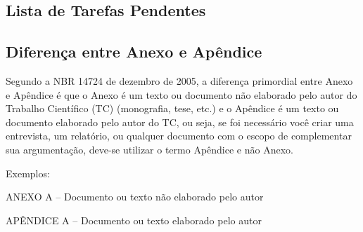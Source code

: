 \documentclass[
	12pt,				%
	openright,			%
	twoside,			%
	a4paper,			%
	english,			%
    french,             %
	spanish,			%
	brazil				%
	]{abntex2}
\begin{document}


\postextual




\begin{apendicesenv}

	\partapendices

	\begin{minipage}[c]{0.95\textwidth}
		\chapter{Lista de Tarefas Pendentes}
		\listoftodos[]
	\end{minipage}



\end{apendicesenv}


\begin{anexosenv}

	\partanexos

	\chapter{Diferença entre Anexo e Apêndice}
	Segundo a NBR 14724 de dezembro de 2005, a diferença primordial entre Anexo e Apêndice é que o Anexo é um texto ou documento não elaborado pelo autor do Trabalho Científico (TC) (monografia, tese, etc.) e o Apêndice é um texto ou documento elaborado pelo autor do TC, ou seja, se foi necessário você criar uma entrevista, um relatório, ou qualquer documento com o escopo de complementar sua argumentação, deve-se utilizar o termo Apêndice e não Anexo.

	Exemplos:

	ANEXO A – Documento ou texto não elaborado pelo autor

	APÊNDICE A – Documento ou texto elaborado pelo autor

\end{anexosenv}

\printindex
\end{document}
